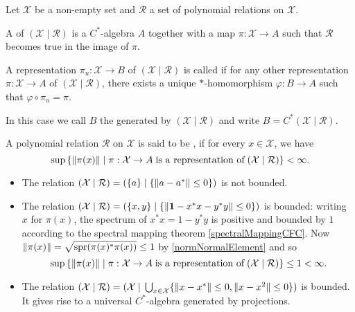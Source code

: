 \begin{definition}
Let $\mathcal{X}$ be a non-empty set and $\mathcal{R}$ a set of polynomial relations on $\mathcal{X}$.

A  of $(\mathcal{X}\;|\;\mathcal{R})$ is a $C^*$-algebra $A$ together with a map $\pi:\mathcal{X}\to A$ such that $\mathcal{R}$ becomes true in the image of $\pi$.

A representation $\pi_u:\mathcal{X}\to B$ of $(\mathcal{X}\;|\;\mathcal{R})$ is called  if for any other representation $\pi:\mathcal{X}\to A$ of $(\mathcal{X}\;|\;\mathcal{R})$, there exists a unique $*$-homomorphism $\varphi: B\to A$ such that $\varphi\circ \pi_u = \pi$.

In this case we call $B$ the  generated by $(\mathcal{X}\;|\;\mathcal{R})$ and write $B= C^*(\mathcal{X}\;|\;\mathcal{R})$.
\end{definition}

\begin{definition}
A polynomial relation $\mathcal{R}$ on $\mathcal{X}$ is said to be , if for every $x\in \mathcal{X}$, we have
\[ \sup\setbuilder{\norm{\pi(x)}}{\pi:\mathcal{X}\to A\;\text{is a representation of}\;(\mathcal{X}\;|\;\mathcal{R})} < \infty. \] 
\end{definition}

\begin{example}
\begin{itemize}
\item The relation $(\mathcal{X}\;|\;\mathcal{R}) = (\{a\}\;|\;\{\lVert a-a^*\rVert\leq 0\})$ is not bounded.
\item The relation $(\mathcal{X}\;|\;\mathcal{R}) = (\{x,y\}\;|\;\{\lVert\boldsymbol{\mathrm{1}}-x^*x-y^*y\rVert\leq 0\})$ is bounded: writing $x$ for $\pi(x)$, the spectrum of $x^*x = 1-y^*y$ is positive and bounded by $1$ according to the spectral mapping theorem \ref{spectralMappingCFC}. Now $\lVert\pi(x)\rVert = \sqrt{\operatorname{spr}(\pi(x)^*\pi(x))} \leq 1$ by \ref{normNormalElement} and so
\[ \sup\setbuilder{\norm{\pi(x)}}{\pi:\mathcal{X}\to A\;\text{is a representation of}\;(\mathcal{X}\;|\;\mathcal{R})} \leq 1 < \infty. \]
\item The relation $(\mathcal{X}\;|\;\mathcal{R}) = (\mathcal{X}\;|\;\bigcup_{x\in\mathcal{X}}\{\lVert x-x^*\rVert\leq 0,\lVert x-x^2\rVert\leq 0 \})$ is bounded. It gives rise to a universal $C^*$-algebra generated by projections.
\end{itemize}
\end{example}

